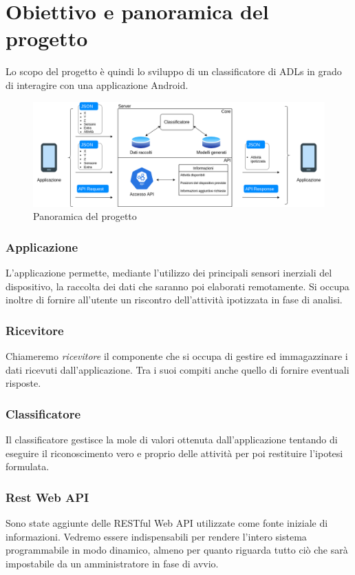 \section{Obiettivo e panoramica del progetto}
Lo scopo del progetto è quindi lo sviluppo di un classificatore di ADLs in grado di interagire con una applicazione
Android.

\begin{figure}[H]
    \centering
    \includegraphics[scale = 0.41]{assets/images/overview.png}
    \caption{Panoramica del progetto}
    \label{fig:overview}
\end{figure}

\subsubsection{Applicazione}
L'applicazione permette, mediante l'utilizzo dei principali sensori inerziali del dispositivo, la raccolta dei dati che saranno poi elaborati 
remotamente. Si occupa inoltre di fornire all'utente un riscontro dell'attività ipotizzata in fase di analisi.
\subsubsection{Ricevitore}
Chiameremo \textit{ricevitore} il componente che si occupa di gestire ed immagazzinare i dati ricevuti dall'applicazione. 
Tra i suoi compiti anche quello di fornire eventuali risposte.
\subsubsection{Classificatore}
Il classificatore gestisce la mole di valori ottenuta 
dall'applicazione tentando di eseguire il riconoscimento vero e proprio delle attività 
per poi restituire l'ipotesi formulata.
\subsubsection{Rest Web API}
Sono state aggiunte delle RESTful Web API utilizzate come fonte iniziale di informazioni. 
Vedremo essere indispensabili per rendere l'intero sistema programmabile in modo dinamico, almeno per quanto riguarda 
tutto ciò che sarà impostabile da un amministratore in fase di avvio.